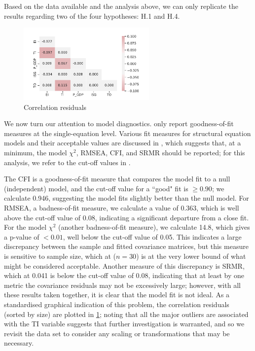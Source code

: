\documentclass[11pt,a4paper]{article}
\begin{document}
\noindent 
Based on the data available and the analysis above, we can only replicate the results regarding two of the four hypotheses: H.1 and H.4.

\begin{figure}[tbp]
\centering
\includegraphics[width=0.6\textwidth]{./plots/original_correlation_residuals.pdf}
\caption{Correlation residuals}
\label{fig:original_corr_resid}
\end{figure}

We now turn our attention to model diagnostics.
\cite{panHowIndustrializationTrade2019} only report goodness-of-fit measures at the single-equation level.
Various fit measures for structural equation models and their acceptable values are discussed in \cite{klinePrinciplesPracticeStructural2016}, which suggests that, at a minimum, the model $\chi^2$, RMSEA, CFI, and SRMR should be reported; for this analysis, we refer to the cut-off values in \cite{parryFitIndicesCommonly2020}.

The CFI is a goodness-of-fit measure that compares the model fit to a null (independent) model, and the cut-off value for a ``good" fit is $\geq0.90$; we calculate 0.946, suggesting the model fits slightly better than the null model. 
For RMSEA, a badness-of-fit measure, we calculate a value of 0.363, which is well above the cut-off value of 0.08, indicating a significant departure from a close fit.
For the model $\chi^2$ (another badness-of-fit measure), we calculate 14.8, which gives a p-value of $<0.01$, well below the cut-off value of 0.05.
This indicates a large discrepancy between the sample and fitted covariance matrices, but this measure is sensitive to sample size, which at ($n=30$) is at the very lower bound of what might be considered acceptable.
Another measure of this discrepancy is SRMR, which at 0.041 is below the cut-off value of 0.08, indicating that at least by one metric the covariance residuals may not be excessively large; however, with all these results taken together, it is clear that the model fit is not ideal.
As a standardised graphical indication of this problem, the correlation residuals (sorted by size) are plotted in \cref{fig:original_corr_resid}; noting that all the major outliers are associated with the TI variable suggests that further investigation is warranted, and so we revisit the data set to consider any scaling or transformations that may be necessary.
\end{document}
